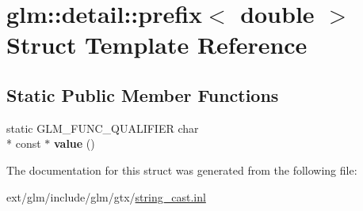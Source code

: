 \hypertarget{structglm_1_1detail_1_1prefix_3_01double_01_4}{\section{glm\-:\-:detail\-:\-:prefix$<$ double $>$ Struct Template Reference}
\label{structglm_1_1detail_1_1prefix_3_01double_01_4}
}
\subsection*{Static Public Member Functions}
\begin{DoxyCompactItemize}
\item 
\hypertarget{structglm_1_1detail_1_1prefix_3_01double_01_4_a39aa4646d7de33a2382c92db849d6eb5}{static G\-L\-M\-\_\-\-F\-U\-N\-C\-\_\-\-Q\-U\-A\-L\-I\-F\-I\-E\-R char \\*
const $\ast$ {\bfseries value} ()}\label{structglm_1_1detail_1_1prefix_3_01double_01_4_a39aa4646d7de33a2382c92db849d6eb5}

\end{DoxyCompactItemize}


The documentation for this struct was generated from the following file\-:\begin{DoxyCompactItemize}
\item 
ext/glm/include/glm/gtx/\hyperlink{string__cast_8inl}{string\-\_\-cast.\-inl}\end{DoxyCompactItemize}
